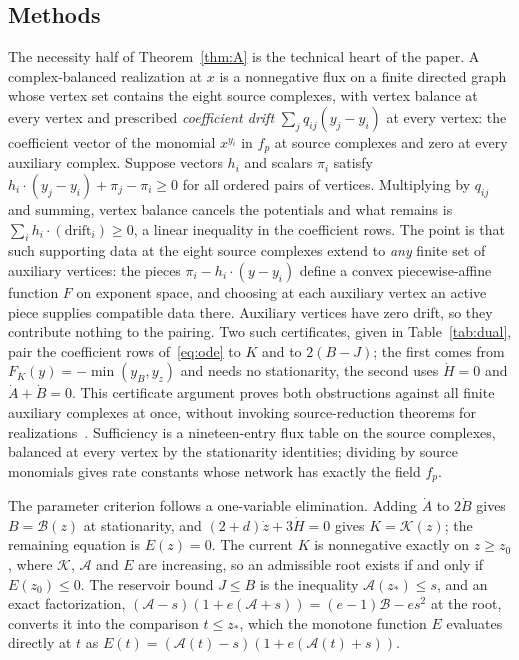 \documentclass[11pt,a4paper]{article}
\theoremstyle{plain}
\theoremstyle{definition}
\theoremstyle{remark}
\newcommand{\rA}{\mathcal{A}}
\newcommand{\rB}{\mathcal{B}}
\newcommand{\rK}{\mathcal{K}}
\begin{document}
\subsection{Methods}\label{sec:methods}

The necessity half of Theorem~\ref{thm:A} is the technical heart of the paper. A complex-balanced realization at $x$ is a nonnegative flux on a finite directed graph whose vertex set contains the eight source complexes, with vertex balance at every vertex and prescribed \emph{coefficient drift} $\sum_j q_{ij}(y_j-y_i)$ at every vertex: the coefficient vector of the monomial $x^{y_i}$ in $f_p$ at source complexes and zero at every auxiliary complex. Suppose vectors $h_i$ and scalars $\pi_i$ satisfy $h_i\cdot(y_j-y_i)+\pi_j-\pi_i\ge0$ for all ordered pairs of vertices. Multiplying by $q_{ij}$ and summing, vertex balance cancels the potentials and what remains is $\sum_ih_i\cdot(\text{drift}_i)\ge0$, a linear inequality in the coefficient rows. The point is that such supporting data at the eight source complexes extend to \emph{any} finite set of auxiliary vertices: the pieces $\pi_i-h_i\cdot(y-y_i)$ define a convex piecewise-affine function $F$ on exponent space, and choosing at each auxiliary vertex an active piece supplies compatible data there. Auxiliary vertices have zero drift, so they contribute nothing to the pairing. Two such certificates, given in Table~\ref{tab:dual}, pair the coefficient rows of~\eqref{eq:ode} to $K$ and to $2(B-J)$; the first comes from $F_K(y)=-\min(y_B,y_z)$ and needs no stationarity, the second uses $\dot H=0$ and $\dot A+\dot B=0$. This certificate argument proves both obstructions against all finite auxiliary complexes at once, without invoking source-reduction theorems for realizations~\cite{CraciunJinYu2020}. Sufficiency is a nineteen-entry flux table on the source complexes, balanced at every vertex by the stationarity identities; dividing by source monomials gives rate constants whose network has exactly the field $f_p$.

The parameter criterion follows a one-variable elimination. Adding $\dot A$ to $2\dot B$ gives $B=\rB(z)$ at stationarity, and $(2+d)\dot z+3\dot H=0$ gives $K=\rK(z)$; the remaining equation is $E(z)=0$. The current $K$ is nonnegative exactly on $z\ge z_0$, where $\rK$, $\rA$ and $E$ are increasing, so an admissible root exists if and only if $E(z_0)\le0$. The reservoir bound $J\le B$ is the inequality $\rA(z_*)\le s$, and an exact factorization, $(\rA-s)(1+e(\rA+s))=(e-1)\rB-es^2$ at the root, converts it into the comparison $t\le z_*$, which the monotone function $E$ evaluates directly at $t$ as $E(t)=(\rA(t)-s)(1+e(\rA(t)+s))$.
\end{document}
